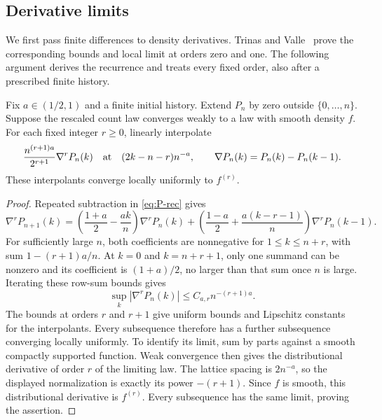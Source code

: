 \subsection{Derivative limits}\label{app:derivative-limits}

We first pass finite differences to density derivatives. Trinas and
Valle~\cite[Proposition~2.1 and Theorem~3.1]{tv2026} prove the
corresponding bounds and local limit at orders zero and one.
The following argument derives the recurrence and treats every
fixed order, also after a prescribed finite history.

\begin{lemma}\label{lem:derivative-limits}
Fix $a\in(1/2,1)$ and a finite initial history. Extend $P_n$ by zero
outside $\{0,\ldots,n\}$. Suppose the rescaled
count law converges weakly to a law with smooth density $f$.
For each fixed integer $r\ge0$, linearly interpolate
\[
 \frac{n^{(r+1)a}}{2^{r+1}}\nabla^rP_n(k)
 \quad\hbox{at}\quad (2k-n-r)n^{-a},
 \qquad \nabla P_n(k)=P_n(k)-P_n(k-1).
\]
These interpolants converge locally uniformly to $f^{(r)}$.
\end{lemma}

\begin{proof}
Repeated subtraction in \eqref{eq:P-rec} gives
\[
 \nabla^rP_{n+1}(k)
 =\left(\frac{1+a}{2}-\frac{ak}{n}\right)\nabla^rP_n(k)
 +\left(\frac{1-a}{2}+\frac{a(k-r-1)}n\right)\nabla^rP_n(k-1).
\]
For sufficiently large $n$, both coefficients are nonnegative for
$1\le k\le n+r$, with sum $1-(r+1)a/n$.
At $k=0$ and $k=n+r+1$, only one summand can be nonzero and
its coefficient is $(1+a)/2$, no larger than that sum once $n$ is large.
Iterating these row-sum bounds gives
\[
 \sup_k|\nabla^rP_n(k)|\le C_{a,r}n^{-(r+1)a}.
\]
The bounds at orders $r$ and $r+1$ give uniform bounds and Lipschitz
constants for the interpolants. Every subsequence therefore has a further subsequence converging
locally uniformly. To identify its limit, sum by parts against
a smooth compactly supported function. Weak convergence then gives
the distributional derivative of order $r$ of the limiting law. The lattice spacing is $2n^{-a}$, so the displayed
normalization is exactly its power $-(r+1)$.
Since $f$ is smooth, this distributional derivative is $f^{(r)}$.
Every subsequence has the same limit, proving the assertion.
\end{proof}
